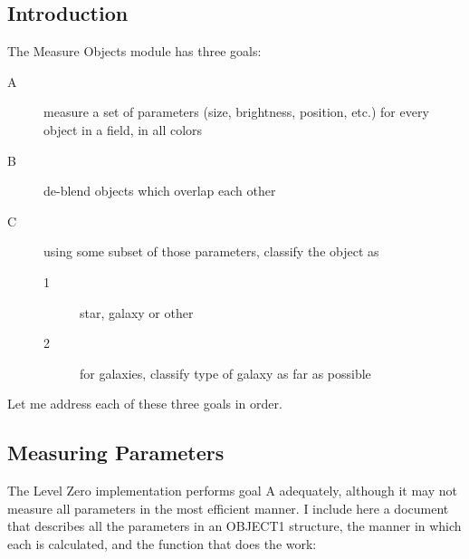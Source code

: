 
\subsection {Introduction}

  The Measure Objects module has three goals:

\begin {description}
\item [A] measure a set of parameters (size, brightness, position, etc.)
             for every object in a field, in all colors
\item [B] de-blend objects which overlap each other
\item [C] using some subset of those parameters, classify the object as
   \begin {description}
   \item [1] star, galaxy or other
   \item [2] for galaxies, classify type of galaxy as far as possible
   \end {description}
\end {description}

  Let me address each of these three goals in order.

\subsection {Measuring Parameters}

  The Level Zero implementation performs goal A adequately, although 
it may not measure all parameters in the most efficient manner.
I include here a document that describes all the parameters 
in an OBJECT1 structure, the manner in 
which each is calculated, and the function that does the work: 

